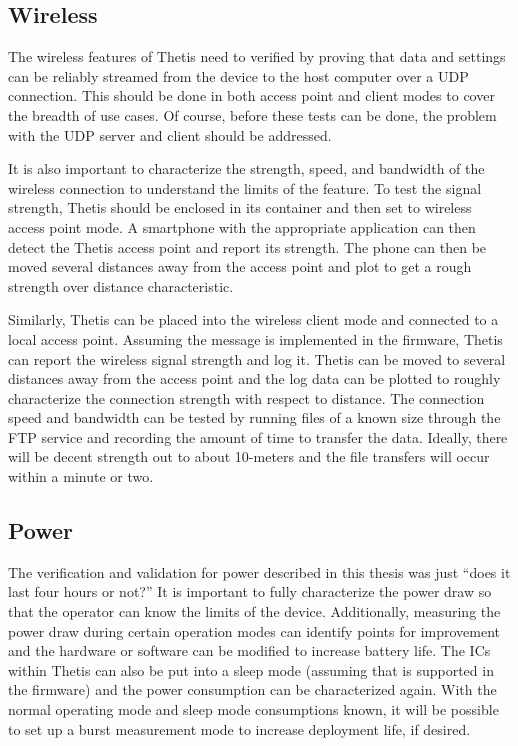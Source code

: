 \subsection{Wireless} 
The wireless features of Thetis need to verified by proving that data and settings can be reliably streamed from the device to the host computer over a UDP connection.
This should be done in both access point and client modes to cover the breadth of use cases.
Of course, before these tests can be done, the problem with the UDP server and client should be addressed.

It is also important to characterize the strength, speed, and bandwidth of the wireless connection to understand the limits of the feature.
To test the signal strength, Thetis should be enclosed in its container and then set to wireless access point mode.
A smartphone with the appropriate application can then detect the Thetis access point and report its strength.
The phone can then be moved several distances away from the access point and plot to get a rough strength over distance characteristic.

Similarly, Thetis can be placed into the wireless client mode and connected to a local access point.
Assuming the message is implemented in the firmware, Thetis can report the wireless signal strength and log it.
Thetis can be moved to several distances away from the access point and the log data can be plotted to roughly characterize the connection strength with respect to distance.
The connection speed and bandwidth can be tested by running files of a known size through the FTP service and recording the amount of time to transfer the data.
Ideally, there will be decent strength out to about 10-meters and the file transfers will occur within a minute or two.

\subsection{Power} 
The verification and validation for power described in this thesis was just ``does it last four hours or not?''
It is important to fully characterize the power draw so that the operator can know the limits of the device.
Additionally, measuring the power draw during certain operation modes can identify points for improvement and the hardware or software can be modified to increase battery life.
The ICs within Thetis can also be put into a sleep mode (assuming that is supported in the firmware) and the power consumption can be characterized again.
With the normal operating mode and sleep mode consumptions known, it will be possible to set up a burst measurement mode to increase deployment life, if desired.

